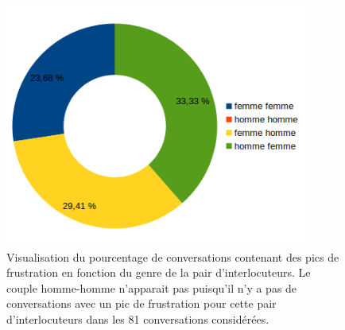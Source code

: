 \begin{figure}[h]
  \centering
  \includegraphics[width=10cm]{./Chapitre7/figures/genre.png}
  \caption{Visualisation du pourcentage de conversations contenant des pics de frustration en fonction du genre de la pair d'interlocuteurs. Le couple homme-homme n'apparait pas puisqu'il n'y a pas de conversations avec un pic de frustration pour cette pair d'interlocuteurs dans les 81 conversations considérées.}
  \label{fig:genre}
\end{figure}
